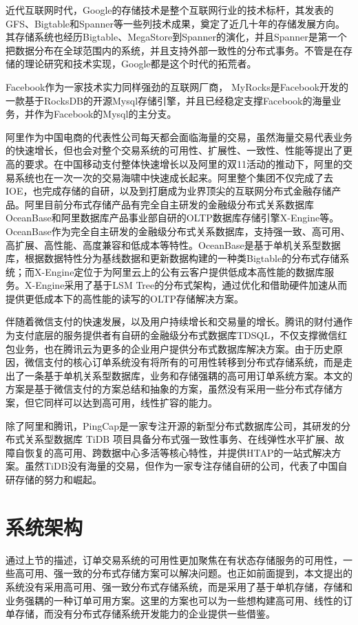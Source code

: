 \documentclass[letterpaper,twocolumn,10pt]{article}
\begin{document}
近代互联网时代，Google的存储技术是整个互联网行业的技术标杆，其发表的GFS、Bigtable和Spanner等一些列技术成果，奠定了近几十年的存储发展方向。其存储系统也经历Bigtable、MegaStore到Spanner的演化，并且Spanner是第一个把数据分布在全球范围内的系统，并且支持外部一致性的分布式事务。不管是在存储的理论研究和技术实现，Google都是这个时代的拓荒者。

Facebook作为一家技术实力同样强劲的互联网厂商， MyRocks是Facebook开发的一款基于RocksDB的开源Mysql存储引擎，并且已经稳定支撑Facebook的海量业务，并作为Facebook的Mysql的主分支。

阿里作为中国电商的代表性公司每天都会面临海量的交易，虽然海量交易代表业务的快速增长，但也会对整个交易系统的可用性、扩展性、一致性、性能等提出了更高的要求。在中国移动支付整体快速增长以及阿里的双11活动的推动下，阿里的交易系统也在一次一次的交易海啸中快速成长起来。阿里整个集团不仅完成了去IOE，也完成存储的自研，以及到打磨成为业界顶尖的互联网分布式金融存储产品。阿里目前分布式存储产品有完全自主研发的金融级分布式关系数据库OceanBase和阿里数据库产品事业部自研的OLTP数据库存储引擎X-Engine等。OceanBase作为完全自主研发的金融级分布式关系数据库，支持强一致、高可用、高扩展、高性能、高度兼容和低成本等特性。OceanBase是基于单机关系型数据库，根据数据特性分为基线数据和更新数据构建的一种类Bigtable的分布式存储系统；而X-Engine定位于为阿里云上的公有云客户提供低成本高性能的数据库服务。X-Engine采用了基于LSM Tree的分布式架构，通过优化和借助硬件加速从而提供更低成本下的高性能的读写的OLTP存储解决方案。

伴随着微信支付的快速发展，以及用户持续增长和交易量的增长。腾讯的财付通作为支付底层的服务提供者有自研的金融级分布式数据库TDSQL，不仅支撑微信红包业务，也在腾讯云为更多的企业用户提供分布式数据库解决方案。由于历史原因，微信支付的核心订单系统没有将所有的可用性转移到分布式存储系统，而是走出了一条基于单机关系型数据库，业务和存储强耦的高可用订单系统方案。本文的方案是基于微信支付的方案总结和抽象的方案，虽然没有采用一些分布式存储方案，但它同样可以达到高可用，线性扩容的能力。

除了阿里和腾讯，PingCap是一家专注开源的新型分布式数据库公司，其研发的分布式关系型数据库 TiDB 项目具备分布式强一致性事务、在线弹性水平扩展、故障自恢复的高可用、跨数据中心多活等核心特性，并提供HTAP的一站式解决方案。虽然TiDB没有海量的交易，但作为一家专注存储自研的公司，代表了中国自研存储的努力和崛起。


\section{系统架构}
通过上节的描述，订单交易系统的可用性更加聚焦在有状态存储服务的可用性，一些高可用、强一致的分布式存储方案可以解决问题。也正如前面提到，本文提出的系统没有采用高可用、强一致分布式存储系统，而是采用了基于单机存储，存储和业务强耦的一种订单可用方案。这里的方案也可以为一些想构建高可用、线性的订单存储，而没有分布式存储系统开发能力的企业提供一些借鉴。
\end{document}
